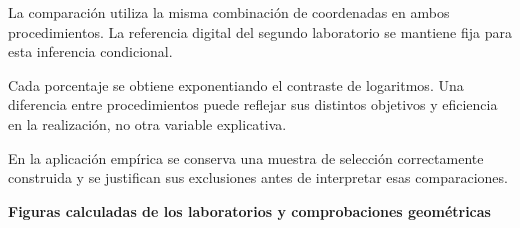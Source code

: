 \documentclass[11pt,a4paper]{article}
\begin{document}
La comparación utiliza la misma combinación de coordenadas en ambos procedimientos. La referencia digital del segundo laboratorio se mantiene fija para esta inferencia condicional.

Cada porcentaje se obtiene exponentiando el contraste de logaritmos. Una diferencia entre procedimientos puede reflejar sus distintos objetivos y eficiencia en la realización, no otra variable explicativa.

En la aplicación empírica se conserva una muestra de selección correctamente construida y se justifican sus exclusiones antes de interpretar esas comparaciones.

\clearpage
{}
{\large\bfseries\color{azul}Figuras calculadas de los laboratorios y comprobaciones geométricas}\par\vspace{2mm}
\end{document}
